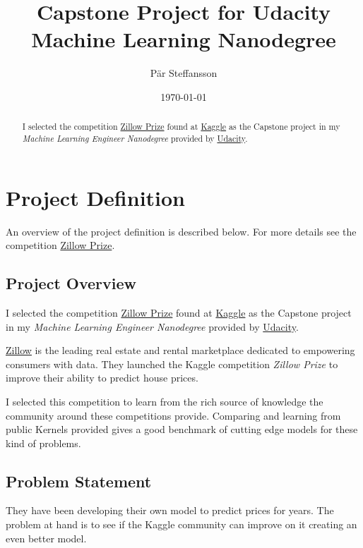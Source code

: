 \documentclass[a4paper]{article}
\title{Capstone Project for Udacity Machine Learning Nanodegree}
\author{Pär Steffansson}
\date{\today}
\begin{document}
\maketitle

\begin{abstract}
I selected the competition \href{https://www.kaggle.com/c/zillow-prize-1#description}{Zillow Prize} found at
\href{https://www.kaggle.com}{Kaggle} as the Capstone project in my \textit{Machine Learning Engineer Nanodegree}
provided by \href{https://www.udacity.com}{Udacity}.
\end{abstract}

\tableofcontents

\section{Project Definition}
An overview of the project definition is described below. For more details see the competition
\href{https://www.kaggle.com/c/zillow-prize-1#description}{Zillow Prize}.

\subsection{Project Overview}
%
%
I selected the competition \href{https://www.kaggle.com/c/zillow-prize-1#description}{Zillow Prize} found at
\href{https://www.kaggle.com}{Kaggle} as the Capstone project in my \textit{Machine Learning Engineer Nanodegree}
provided by \href{https://www.udacity.com}{Udacity}.

\href{https://www.zillow.com}{Zillow} is the leading real estate and rental marketplace dedicated to empowering
consumers with data. They launched the Kaggle competition \textit{Zillow Prize} to improve their ability to predict
house prices.

I selected this competition to learn from the rich source of knowledge the community around these competitions
provide. Comparing and learning from public Kernels provided gives a good benchmark of cutting edge models
for these kind of problems.

\subsection{Problem Statement}
%
%
They have been developing their own model to predict prices for years. The problem at hand is to see if the
Kaggle community can improve on it creating an even better model.
\end{document}
